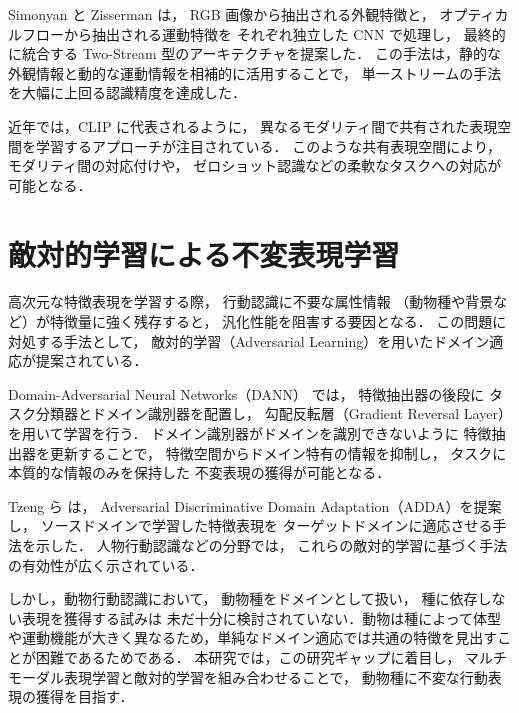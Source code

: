Simonyan と Zisserman \cite{simonyan2014two} は，
RGB 画像から抽出される外観特徴と，
オプティカルフローから抽出される運動特徴を
それぞれ独立した CNN で処理し，
最終的に統合する Two-Stream 型のアーキテクチャを提案した．
この手法は，静的な外観情報と動的な運動情報を相補的に活用することで，
単一ストリームの手法を大幅に上回る認識精度を達成した．

近年では，CLIP \cite{radford2021clip} に代表されるように，
異なるモダリティ間で共有された表現空間を学習するアプローチが注目されている．
このような共有表現空間により，
モダリティ間の対応付けや，
ゼロショット認識などの柔軟なタスクへの対応が可能となる．

\section{敵対的学習による不変表現学習}

高次元な特徴表現を学習する際，
行動認識に不要な属性情報
（動物種や背景など）が特徴量に強く残存すると，
汎化性能を阻害する要因となる．
この問題に対処する手法として，
敵対的学習（Adversarial Learning）を用いたドメイン適応が提案されている．

Domain-Adversarial Neural Networks（DANN）\cite{ganin2016domain} では，
特徴抽出器の後段に
タスク分類器とドメイン識別器を配置し，
勾配反転層（Gradient Reversal Layer）を用いて学習を行う．
ドメイン識別器がドメインを識別できないように
特徴抽出器を更新することで，
特徴空間からドメイン特有の情報を抑制し，
タスクに本質的な情報のみを保持した
不変表現の獲得が可能となる．

Tzeng ら \cite{tzeng2017adversarial} は，
Adversarial Discriminative Domain Adaptation（ADDA）を提案し，
ソースドメインで学習した特徴表現を
ターゲットドメインに適応させる手法を示した．
人物行動認識などの分野では，
これらの敵対的学習に基づく手法の有効性が広く示されている．

しかし，動物行動認識において，
動物種をドメインとして扱い，
種に依存しない表現を獲得する試みは
未だ十分に検討されていない．動物は種によって体型や運動機能が大きく異なるため，単純なドメイン適応では共通の特徴を見出すことが困難であるためである．
本研究では，この研究ギャップに着目し，
マルチモーダル表現学習と敵対的学習を組み合わせることで，
動物種に不変な行動表現の獲得を目指す．
